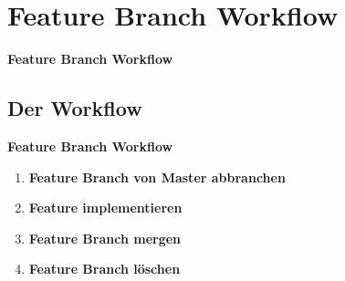 \section{Feature Branch Workflow}\label{sec:feature-branch-workflow}
\begin{frame}[c]
    \centering
    \Large
    \textbf{Feature Branch Workflow}
\end{frame}

\subsection{Der Workflow}\label{subsec:der-workflow}
\begin{frame}[c]
    \slidehead
    \centering
    \large
    \textbf{Feature Branch Workflow}
    \vspace{1em}
    \begin{enumerate}[<+->]
        \item \textbf{Feature Branch von Master abbranchen}
        \item \textbf{Feature implementieren}
        \item \textbf{Feature Branch mergen}
        \item \textbf{Feature Branch löschen}
    \end{enumerate}
\end{frame}

